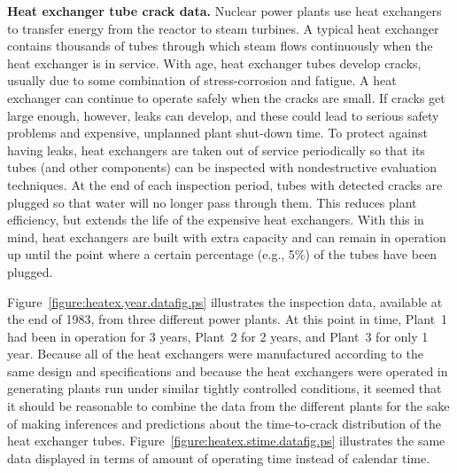 \begin{example}
\label{example:heat.exchanger.data}
{\bf Heat exchanger tube crack data.} Nuclear power plants use heat
exchangers to transfer energy from the reactor to steam turbines.  A
typical heat exchanger contains thousands of tubes through which steam
flows continuously when the heat exchanger is in service.  With age,
heat exchanger tubes develop cracks, usually due to some combination
of stress-corrosion and fatigue. A heat exchanger can continue to
operate safely when the cracks are small.  If cracks get large enough,
however, leaks can develop, and these could lead to serious safety
problems and expensive, unplanned plant shut-down time. To protect
against having leaks, heat exchangers are taken out of service
periodically so that its tubes (and other components) can be inspected
with nondestructive evaluation techniques.  At the end of each
inspection period, tubes with detected cracks are plugged so that
water will no longer pass through them.  This reduces plant
efficiency, but extends the life of the expensive heat exchangers.
With this in mind, heat exchangers are built with extra capacity and
can remain in operation up until the point where a certain percentage
(e.g., 5\%) of the tubes have been plugged.

Figure~\ref{figure:heatex.year.datafig.ps} illustrates the inspection
data, available at the end of 1983, from three different power
plants.  At this point in time, Plant~1 had been in operation for 3
years, Plant~2 for 2 years, and Plant~3 for only 1 year.  Because all
of the heat exchangers were manufactured according to the same design
and specifications and because the heat exchangers were operated in
generating plants run under similar tightly controlled conditions, it
seemed that it should be reasonable to combine the data from the
different plants for the sake of making inferences and predictions
about the time-to-crack distribution of the heat exchanger tubes.
Figure~\ref{figure:heatex.stime.datafig.ps} illustrates the same data
displayed in terms of amount of operating time instead of calendar time.


\end{example}
